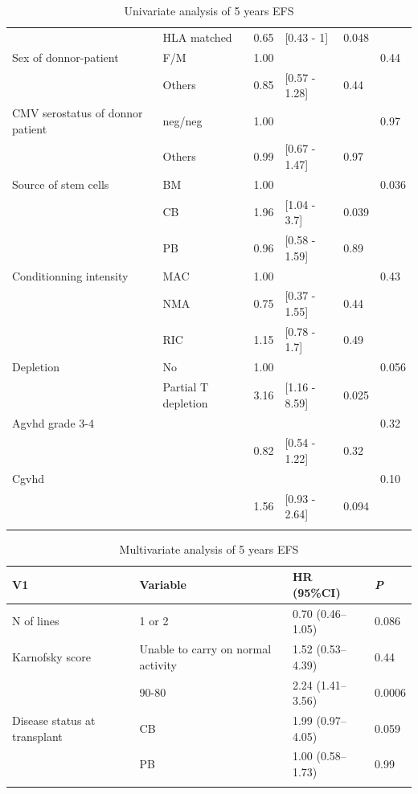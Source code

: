 \documentclass[a4paper,11pt] {article}
\begin{document}
\begin{center}
\begin{landscape}
\begin{longtable}{llrlll}
   & HLA matched & 0.65 & [0.43 - 1] & 0.048 &  \\ 
  Sex of donnor-patient & F/M & 1.00 &  &  & 0.44 \\ 
   & Others & 0.85 & [0.57 - 1.28] & 0.44 &  \\ 
  CMV serostatus of donnor patient & neg/neg & 1.00 &  &  & 0.97 \\ 
   & Others & 0.99 & [0.67 - 1.47] & 0.97 &  \\ 
  Source of stem cells & BM & 1.00 &  &  & 0.036 \\ 
   & CB & 1.96 & [1.04 - 3.7] & 0.039 &  \\ 
   & PB & 0.96 & [0.58 - 1.59] & 0.89 &  \\ 
  Conditionning intensity & MAC & 1.00 &  &  & 0.43 \\ 
   & NMA & 0.75 & [0.37 - 1.55] & 0.44 &  \\ 
   & RIC & 1.15 & [0.78 - 1.7] & 0.49 &  \\ 
  Depletion & No & 1.00 &  &  & 0.056 \\ 
   & Partial T depletion & 3.16 & [1.16 - 8.59] & 0.025 &  \\ 
  Agvhd grade 3-4 &  &  &  &  & 0.32 \\ 
   &  & 0.82 & [0.54 - 1.22] & 0.32 &  \\ 
  Cgvhd &  &  &  &  & 0.10 \\ 
   &  & 1.56 & [0.93 - 2.64] & 0.094 &  \\ 
   \hline
\hline
\caption{Univariate analysis of 5 years EFS} 
\label{tab:uos}
\end{longtable}
\begin{longtable}{llll}
  \hline
V1 & Variable & HR (95\%CI) & \emph{P} \\ 
  \hline
N of lines & 1 or 2 & 0.70 (0.46--1.05) & 0.086 \\ 
  Karnofsky score & Unable to carry on normal activity & 1.52 (0.53--4.39) & 0.44 \\ 
   & 90-80 & 2.24 (1.41--3.56) & 0.0006 \\ 
  Disease status at transplant & CB & 1.99 (0.97--4.05) & 0.059 \\ 
   & PB & 1.00 (0.58--1.73) & 0.99 \\ 
   \hline
\hline
\caption{Multivariate analysis of 5 years EFS} 
\label{tab:uos}
\end{longtable}\end{landscape}




\end{center}
\end{document}
